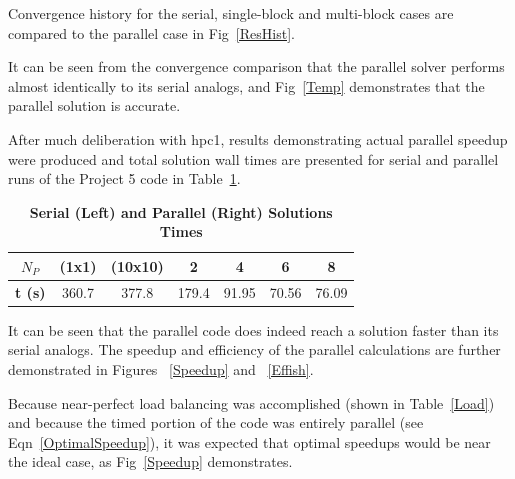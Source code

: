 \documentclass[twocolumn,10pt]{asme2ej}
\begin{document}
Convergence history for the serial, single-block and multi-block cases are compared to the parallel case in Fig~\ref{ResHist}.



It can be seen from the convergence comparison that the parallel solver performs almost identically to its serial analogs, and Fig~\ref{Temp} demonstrates that the parallel solution is accurate.



After much deliberation with hpc1, results demonstrating actual parallel speedup were produced and total solution wall times are presented for serial and parallel runs of the Project 5 code in Table~\ref{Times}.


\vspace{-1.8em}
\begin{table}[htb]
\begin{center}
\caption{\textbf{Serial (Left) and Parallel (Right) Solutions Times}}
\begin{tabular}{|c |c c | c c c c|}
\hline
\textbf{$N_P$} &(1x1) & (10x10) &  2 & 4 & 6  & 8     \\
\hline
 \textbf{t (s)} &360.7  & 377.8 & 179.4 & 91.95 & 70.56 & 76.09 \\
\hline
\end{tabular}
\label{Times}
\end{center}
\end{table}
\vspace{-2.3em}

It can be seen that the parallel code does indeed reach a solution faster than its serial analogs.  The speedup and efficiency of the parallel calculations are further demonstrated in Figures ~\ref{Speedup} and ~\ref{Effish}.










Because near-perfect load balancing was accomplished (shown in Table~\ref{Load}) and because the timed portion of the code was entirely parallel (see Eqn~\ref{OptimalSpeedup}), it was expected that optimal speedups would be near the ideal case, as Fig~\ref{Speedup} demonstrates.
\end{document}
